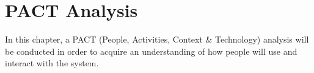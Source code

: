 \chapter{PACT Analysis}
In this chapter, a PACT (People, Activities, Context \& Technology) analysis will be conducted in order to acquire an understanding of how people will use and interact with the system.